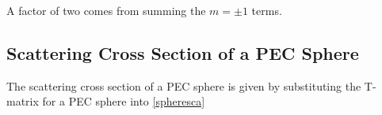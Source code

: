 %
%
%
%
%
%


A factor of two comes from summing the $m=\pm1$ terms. 

\subsection{Scattering Cross Section of a PEC Sphere}

The scattering cross section of a PEC sphere is given by substituting the T-matrix for a PEC sphere into \eqref{spheresca}


